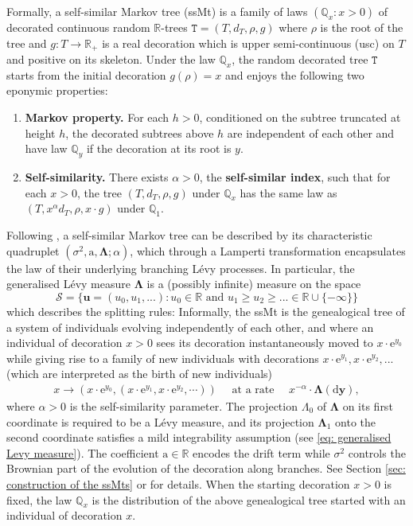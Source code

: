 \documentclass[12pt]{article}
\numberwithin{equation}{section}
\theoremstyle{plain}
\theoremstyle{definition}
\newcommand{\Bd}[1]{\boldsymbol{#1}}
\begin{document}
Formally, a self-similar Markov tree (ssMt) is a family of laws $( \mathbb{Q}_x : x >0)$ of decorated continuous random $\mathbb{R}$-trees $\mathtt{T} = (T, d_T, \rho, g)$ where $\rho$ is the root of the tree and $g : T \to \mathbb{R}_+$ is a real decoration which is upper semi-continuous (usc) on $T$ and positive on its skeleton. Under the law $\mathbb{Q}_x$, the random decorated tree $\mathtt{T}$ starts from the initial decoration  $g(\rho)=x$ and enjoys the following two eponymic properties:
\begin{enumerate}
    \item \textbf{Markov property.} For each $h>0$, conditioned on the subtree truncated at height $h$, the decorated subtrees above $h$ are independent of each other and have law $\mathbb{Q}_y$ if the decoration at its root is $y$.
     \item \textbf{Self-similarity.} There exists $\alpha > 0$,  the \textbf{self-similar index}, such that for each $x>0$, the tree  $(T, d_{T}, \rho, g)$ under $\mathbb{Q}_x$ has the same law as $(T,x^{\alpha}d_T,\rho,x\cdot g) $ under $\mathbb{Q}_1$.
\end{enumerate}
Following \cite[Section 2]{BertoinJean2024SMta}, a self-similar Markov tree can be described by its characteristic quadruplet $(\sigma^2, \mathrm{a}, \boldsymbol{\Lambda}; \alpha)$, which through a Lamperti transformation encapsulates the law of their underlying branching L\'evy processes. In particular, the generalised L\'evy measure $\boldsymbol{\Lambda}$ is a (possibly infinite) measure on the space $$ \mathcal{S} = \{ \mathbf{u}=(u_0,u_1, ...) : u_0  \in \mathbb{R} \mbox{ and }  u_1\geq u_2 \geq ... \in \mathbb{R} \cup \{ - \infty\}\}$$ which describes the splitting rules: Informally, the ssMt is the genealogical tree of a system of individuals evolving  independently of each other, and where an individual of decoration $x >0$ sees its decoration instantaneously moved to $x\cdot\mathrm{e}^{y_0}$ while giving rise to a  family of new individuals with decorations $x \cdot \mathrm{e}^{y_1}, x \cdot \mathrm{e}^{y_2}, ... $ (which are interpreted as the birth of new individuals)
 \begin{eqnarray} x \to (x \cdot \mathrm{e}^{y_0}, (x \cdot \mathrm{e}^{y_1}, x \cdot \mathrm{e}^{y_2}, \cdots )) \quad \mbox{ at a rate } \quad x^{-\alpha} \cdot \boldsymbol{\Lambda}( \mathrm{d} \mathbf{y}),  \label{eq:intensitysplit} \end{eqnarray}  where $\alpha >0$ is the self-similarity parameter. The projection $\Lambda_0$ of $\boldsymbol\Lambda$ on  its first coordinate is required to be a L\'evy measure, and its projection $\Bd\Lambda_1$ onto the second coordinate satisfies a mild integrability assumption (see \eqref{eq: generalised Levy measure}). The  coefficient $ \mathrm{a} \in \mathbb{R}$ encodes the drift term while  $\sigma^2$ controls the Brownian part of the evolution of the decoration along branches. See Section \ref{sec: construction of the ssMts} or \cite{BertoinJean2024SMta} for details. When the starting decoration $x>0$ is fixed, the law $ \mathbb{Q}_x$ is the distribution of the above genealogical tree started with an individual of decoration $x$.
\end{document}
